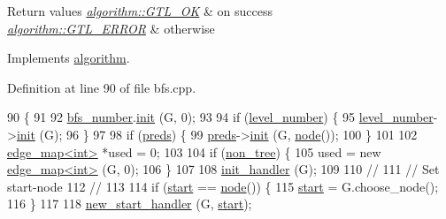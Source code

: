 \begin{DoxyRetVals}{Return values}
{\em \mbox{\hyperlink{classalgorithm_af1a0078e153aa99c24f9bdf0d97f6710a5114c20e4a96a76b5de9f28bf15e282b}{algorithm\+::\+G\+T\+L\+\_\+\+OK}}} & on success \\
\hline
{\em \mbox{\hyperlink{classalgorithm_af1a0078e153aa99c24f9bdf0d97f6710a6fcf574690bbd6cf710837a169510dd7}{algorithm\+::\+G\+T\+L\+\_\+\+E\+R\+R\+OR}}} & otherwise \\
\hline
\end{DoxyRetVals}


Implements \mbox{\hyperlink{classalgorithm_a734b189509a8d6b56b65f8ff772d43ca}{algorithm}}.



Definition at line 90 of file bfs.\+cpp.


\begin{DoxyCode}
90                       \{
91     
92     \mbox{\hyperlink{classbfs_a59d0c5c5ad2715776b20b1aec03dbc3a}{bfs\_number}}.\mbox{\hyperlink{classne__map_a4ef2ab4aebcb57a7a101975bf6a88e24}{init}} (G, 0);
93 
94     \textcolor{keywordflow}{if} (\mbox{\hyperlink{classbfs_aab92e9d128612c28324aafe4750dbc84}{level\_number}}) \{
95     \mbox{\hyperlink{classbfs_aab92e9d128612c28324aafe4750dbc84}{level\_number}}->\mbox{\hyperlink{classne__map_a4ef2ab4aebcb57a7a101975bf6a88e24}{init}} (G);
96     \}
97 
98     \textcolor{keywordflow}{if} (\mbox{\hyperlink{classbfs_a3bac5ed333bb78a30a67099c3b94aa0c}{preds}}) \{
99     \mbox{\hyperlink{classbfs_a3bac5ed333bb78a30a67099c3b94aa0c}{preds}}->\mbox{\hyperlink{classne__map_a4ef2ab4aebcb57a7a101975bf6a88e24}{init}} (G, \mbox{\hyperlink{classnode}{node}}());
100     \}
101 
102     \mbox{\hyperlink{classedge__map}{edge\_map<int>}} *used = 0;
103 
104     \textcolor{keywordflow}{if} (\mbox{\hyperlink{classbfs_a056b2131db11e62eb8f41c8dcc117d2e}{non\_tree}}) \{
105     used = \textcolor{keyword}{new} \mbox{\hyperlink{classedge__map}{edge\_map<int>}} (G, 0);
106     \}
107 
108     \mbox{\hyperlink{classbfs_a558582dd7a92ce3b3b512c523e589c23}{init\_handler}} (G);
109 
110     \textcolor{comment}{//}
111     \textcolor{comment}{// Set start-node }
112     \textcolor{comment}{// }
113 
114     \textcolor{keywordflow}{if} (\mbox{\hyperlink{classbfs_af2ab561d9e60a9fc2e25b02d1f807f96}{start}} == \mbox{\hyperlink{classnode}{node}}()) \{
115     \mbox{\hyperlink{classbfs_af2ab561d9e60a9fc2e25b02d1f807f96}{start}} = G.choose\_node();
116     \}
117 
118     \mbox{\hyperlink{classbfs_ab89a3d1cb36b20a86837b0345063e4b1}{new\_start\_handler}} (G, \mbox{\hyperlink{classbfs_af2ab561d9e60a9fc2e25b02d1f807f96}{start}});

\end{DoxyCode}
